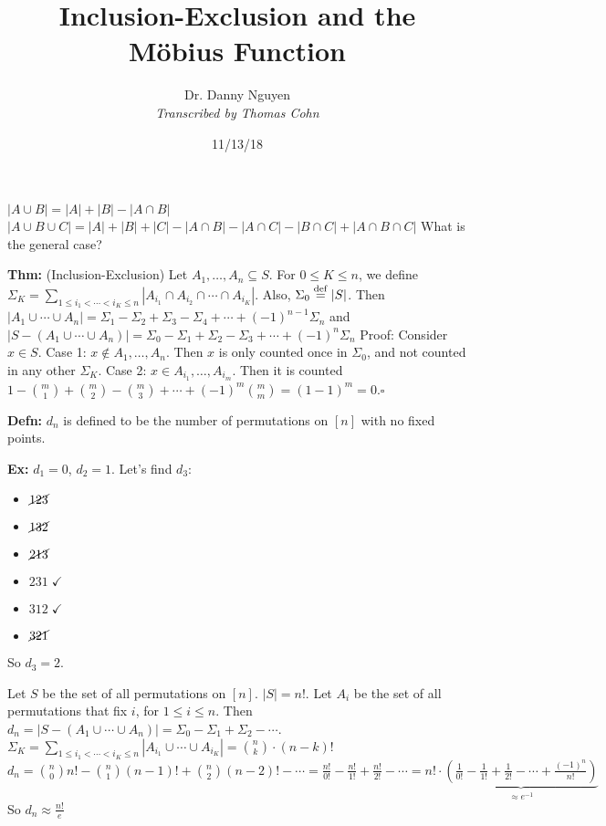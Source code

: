 \documentclass[10pt,letterpaper]{article}
\author{Dr. Danny Nguyen\\ \small\textit{Transcribed by Thomas Cohn}}
\title{Inclusion-Exclusion and the M\"obius Function}
\date{11/13/18} %
\newcommand{\n}{\hfill\break}
\newcommand{\defn}[1]{\par\noindent\settowidth{\hangindent}{\textbf{Defn: }}\textbf{Defn: }#1\n}
\newcommand{\thm}[1]{\par\noindent\settowidth{\hangindent}{\textbf{Thm: }}\textbf{Thm: }#1\n}
\newcommand{\ex}[1]{\par\noindent\settowidth{\hangindent}{\textbf{Ex: }}\textbf{Ex: }#1\n}
\newcommand{\proven}{\;$\square$\n}
\newcommand{\ptxt}[1]{\textrm{\textnormal{#1}}}
\newcommand{\card}[1]{\left|#1\right|}
\newcommand{\inv}{^{-1}}
\begin{document}
\maketitle
\setlength\RaggedRightParindent{\parindent}
\RaggedRight

\par\noindent $\card{A\cup{}B}=\card{A}+\card{B}-\card{A\cap{}B}$\n
$\card{A\cup{}B\cup{}C}=\card{A}+\card{B}+\card{C}-\card{A\cap{}B}-\card{A\cap{}C}-\card{B\cap{}C}+\card{A\cap{}B\cap{}C}$\n
What is the general case?\n

\thm{(Inclusion-Exclusion) Let $A_{1},\ldots,A_{n}\subseteq{}S$. For $0\le{}K\le{}n$, we define $\displaystyle\Sigma_{K}=\sum_{1\le{}i_{1}<\cdots<i_{K}\le{}n}\card{A_{i_{1}}\cap{}A_{i_{2}}\cap\cdots\cap{}A_{i_{K}}}$. Also, $\Sigma_{0}\overset{\ptxt{def}}{=}\card{S}$.\n
Then $\card{A_{1}\cup\cdots\cup{}A_{n}}=\Sigma_{1}-\Sigma_{2}+\Sigma_{3}-\Sigma_{4}+\cdots+(-1)^{n-1}\Sigma_{n}$\n
and $\card{S-(A_{1}\cup\cdots\cup{}A_{n})}=\Sigma_{0}-\Sigma_{1}+\Sigma_{2}-\Sigma_{3}+\cdots+(-1)^{n}\Sigma_{n}$\n
\n
Proof: Consider $x\in{}S$. Case 1: $x\not\in{}A_{1},\ldots,A_{n}$. Then $x$ is only counted once in $\Sigma_{0}$, and not counted in any other $\Sigma_{K}$.\n
Case 2: $x\in{}A_{i_{1}},\ldots,A_{i_{m}}$. Then it is counted $1-\binom{m}{1}+\binom{m}{2}-\binom{m}{3}+\cdots+(-1)^{m}\binom{m}{m}=(1-1)^{m}=0$.\proven}

\defn{$d_{n}$ is defined to be the number of permutations on $[n]$ with no fixed points.}

\ex{$d_{1}=0$, $d_{2}=1$. Let's find $d_{3}$:
\begin{itemize}
	\item $\cancel{123}$
	\item $\cancel{132}$
	\item $\cancel{213}$
	\item $231\;\checkmark$
	\item $312\;\checkmark$
	\item $\cancel{321}$
\end{itemize}
So $d_{3}=2$.}

\par\noindent Let $S$ be the set of all permutations on $[n]$. $\card{S}=n!$.\n
Let $A_{i}$ be the set of all permutations that fix $i$, for $1\le{}i\le{}n$.\n
Then $d_{n}=\card{S-(A_{1}\cup\cdots\cup{}A_{n})}=\Sigma_{0}-\Sigma_{1}+\Sigma_{2}-\cdots$.\n
$\displaystyle\Sigma_{K}=\sum_{1\le{}i_{1}<\cdots<i_{K}\le{}n}\card{A_{i_{1}}\cup\cdots\cup{}A_{i_{K}}}=\binom{n}{k}\cdot(n-k)!$\n
$d_{n}=\binom{n}{0}n!-\binom{n}{1}(n-1)!+\binom{n}{2}(n-2)!-\cdots=\frac{n!}{0!}-\frac{n!}{1!}+\frac{n!}{2!}-\cdots=n!\cdot\underbrace{\left(\frac{1}{0!}-\frac{1}{1!}+\frac{1}{2!}-\cdots+\frac{(-1)^{n}}{n!}\right)}_{\approx{}e\inv}$\n
So $d_{n}\approx\frac{n!}{e}$\n
\end{document}
